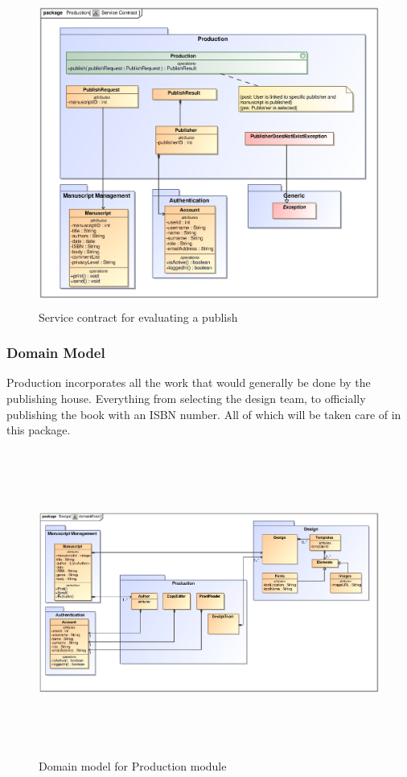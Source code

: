 \begin{enumerate}
\begin{figure}[h]
\includegraphics[height=380px, width=500px]{epsImages/Production/Publish.eps}
\caption{Service contract for evaluating a publish}
\end{figure}

 \newpage
\subsubsection{Domain Model}
\par{Production incorporates all the work that would generally be done by the publishing house. Everything from selecting the design team, to officially publishing the book with an ISBN number. All of which will be taken care of in this package.} 

\begin{figure}[h]
\includegraphics[height=380px, width=500px]{epsImages/DomainModels/ProductionDomainModel.eps}
\caption{Domain model for Production module}
\end{figure}


\end{enumerate}
